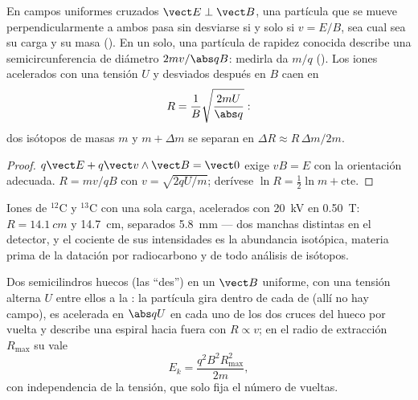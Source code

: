 \begin{proposition}\label{prop:b1:charged-particles:spectrometer}
En campos uniformes cruzados $\vect E \perp \vect B$, una partícula que se
mueve perpendicularmente a ambos pasa sin desviarse si y solo si
$v = E/B$, sea cual sea su carga y su masa (\emph{}). En un  solo, una partícula de rapidez
conocida describe una semicircunferencia de diámetro $2mv/\abs qB$:
medirla da $m/q$ (\emph{}). Los iones acelerados con
una tensión $U$ y desviados después en $B$ caen en
\[
R = \frac{1}{B}\sqrt{\frac{2mU}{\abs q}} :
\]
dos isótopos de masas $m$ y $m + \Delta m$ se separan en $\Delta R \approx
R\,\Delta m/2m$.
\end{proposition}

\begin{proof}
$q\vect E + q\vect v\wedge\vect B = \vect 0$ exige $vB = E$ con la
orientación adecuada. $R = mv/qB$ con $v = \sqrt{2qU/m}$; derívese
$\ln R = \tfrac12\ln m + \text{cte}$.
\end{proof}

\begin{example}\label{ex:b1:charged-particles:isotopes}
Iones de $^{12}$C y $^{13}$C con una sola carga, acelerados con
\qty{20}{kV} en \qty{0.50}{T}: $R = \qty{14.1}{cm}$ y \qty{14.7}{cm},
separados \qty{5.8}{mm} --- dos manchas distintas en el detector, y el
cociente de sus intensidades es la abundancia isotópica, materia prima de
la datación por radiocarbono y de todo análisis de isótopos.
\end{example}

\begin{proposition}[Ciclotrón]\label{prop:b1:charged-particles:cyclotron}
Dos semicilindros huecos (las ``des'') en un $\vect B$ uniforme, con una
tensión alterna $U$ entre ellos a la : la partícula
gira dentro de cada de (allí no hay campo), es acelerada en $\abs qU$ en
cada uno de los dos cruces del hueco por vuelta y describe una espiral
hacia fuera con $R \propto v$; en el radio de extracción $R_{\max}$ su
 vale
\[
E_k = \frac{q^2B^2R_{\max}^2}{2m},
\]
con independencia de la tensión, que solo fija el número de vueltas.
\end{proposition}

